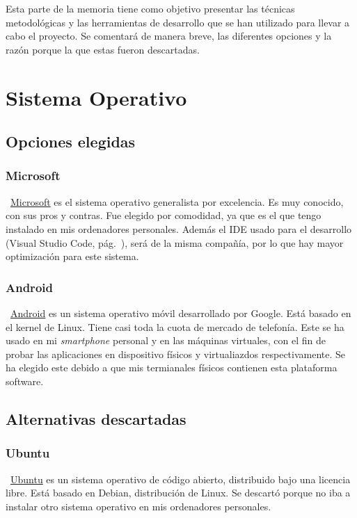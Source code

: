 
Esta parte de la memoria tiene como objetivo presentar las técnicas metodológicas y las herramientas de desarrollo que se han utilizado para llevar a cabo el proyecto. Se comentará de manera breve, las diferentes opciones y la razón porque la que estas fueron descartadas.

\section{Sistema Operativo}

\subsection{Opciones elegidas}

\subsubsection{Microsoft}
~\href{https://www.microsoft.com/es-es}{Microsoft} es el sistema operativo generalista por excelencia. Es muy conocido, con sus pros y contras. Fue elegido por comodidad, ya que es el que tengo instalado en mis ordenadores personales. Además el IDE usado para el desarrollo (Visual Studio Code, pág.~\pageref{visual}), será de la misma compañía, por lo que hay mayor optimización para este sistema.

\subsubsection{Android}
~\href{https://www.android.com/intl/es_es/}{Android} es un sistema operativo móvil desarrollado por Google. Está basado en el kernel de Linux. Tiene casi toda la cuota de mercado de telefonía. Este se ha usado en mi \emph{smartphone} personal y en las máquinas virtuales, con el fin de probar las aplicaciones en dispositivo físicos y virtualiazdos respectivamente. Se ha elegido este debido a que mis termianales físicos contienen esta plataforma software.

\subsection{Alternativas descartadas}

\subsubsection{Ubuntu}
~\href{https://ubuntu.com/}{Ubuntu} es un sistema operativo de código abierto, distribuido bajo una licencia libre. Está basado en Debian, distribución de Linux. Se descartó porque no iba a instalar otro sistema operativo en mis ordenadores personales.


